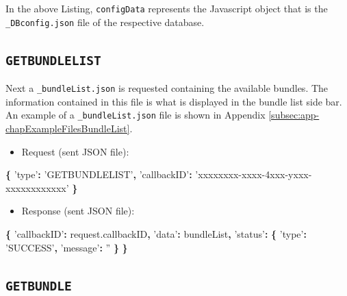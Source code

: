 \documentclass[]{book}
\newenvironment{Shaded}{\begin{snugshade}}{\end{snugshade}}
\newcommand{\AttributeTok}[1]{\textcolor[rgb]{0.77,0.63,0.00}{#1}}
\newcommand{\NormalTok}[1]{#1}
\newcommand{\OperatorTok}[1]{\textcolor[rgb]{0.81,0.36,0.00}{\textbf{#1}}}
\newcommand{\StringTok}[1]{\textcolor[rgb]{0.31,0.60,0.02}{#1}}
\newcommand{\VariableTok}[1]{\textcolor[rgb]{0.00,0.00,0.00}{#1}}
\providecommand{\tightlist}{%
  \setlength{\itemsep}{0pt}\setlength{\parskip}{0pt}}
\begin{document}
In the above Listing, \texttt{configData} represents the Javascript object that is the \texttt{\_DBconfig.json} file of the respective database.

\hypertarget{getbundlelist}{%
\subsection{\texorpdfstring{\texttt{GETBUNDLELIST}}{GETBUNDLELIST}}\label{getbundlelist}}

Next a \texttt{\_bundleList.json} is requested containing the available bundles. The information contained in this file is what is displayed in the bundle list side bar. An example of a \texttt{\_bundleList.json} file is shown in Appendix \ref{subsec:app-chapExampleFilesBundleList}.

\begin{itemize}
\tightlist
\item
  Request (sent JSON file):
\end{itemize}

\begin{Shaded}
\begin{Highlighting}[]
\OperatorTok{\{}
  \StringTok{'type'}\OperatorTok{:} \StringTok{'GETBUNDLELIST'}\OperatorTok{,}
  \StringTok{'callbackID'}\OperatorTok{:} \StringTok{'xxxxxxxx-xxxx-4xxx-yxxx-xxxxxxxxxxxx'}
\OperatorTok{\}}
\end{Highlighting}
\end{Shaded}

\begin{itemize}
\tightlist
\item
  Response (sent JSON file):
\end{itemize}

\begin{Shaded}
\begin{Highlighting}[]
\OperatorTok{\{}
  \StringTok{'callbackID'}\OperatorTok{:} \VariableTok{request}\NormalTok{.}\AttributeTok{callbackID}\OperatorTok{,}
  \StringTok{'data'}\OperatorTok{:}\NormalTok{ bundleList}\OperatorTok{,}
  \StringTok{'status'}\OperatorTok{:} \OperatorTok{\{}
    \StringTok{'type'}\OperatorTok{:} \StringTok{'SUCCESS'}\OperatorTok{,}
    \StringTok{'message'}\OperatorTok{:} \StringTok{''}
  \OperatorTok{\}}
\OperatorTok{\}}
\end{Highlighting}
\end{Shaded}

\hypertarget{getbundle}{%
\subsection{\texorpdfstring{\texttt{GETBUNDLE}}{GETBUNDLE}}\label{getbundle}}
\end{document}
